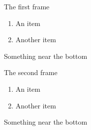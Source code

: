 \documentclass{beamer}
\begin{document}
\begin{frame}{The first frame}
\begin{enumerate}
\item An item
\item Another item
\end{enumerate}
\vfill
Something near the bottom
\end{frame}
\begin{frame}{The second frame}
\begin{enumerate}
\item An item
\item Another item
\end{enumerate}
\vfill
Something near the bottom
\end{frame}
\end{document}
